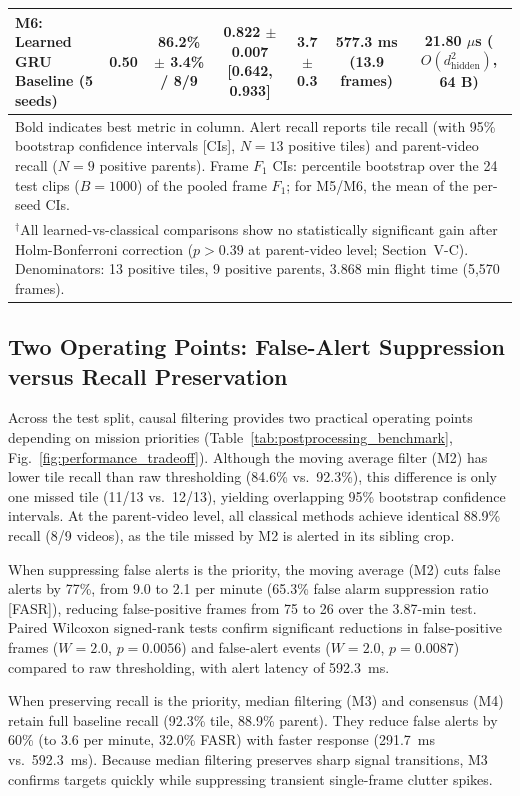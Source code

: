 \documentclass[conference]{IEEEtran}
\begin{document}
\begin{table}[t]
{\begin{tabular}{lcccccc}
M6: Learned GRU Baseline (5 seeds)     & 0.50 & 86.2\% $\pm$ 3.4\% / 8/9                     & \textbf{0.822 $\pm$ 0.007 [0.642, 0.933]} & 3.7 $\pm$ 0.3  & 577.3 ms (13.9 frames)          & 21.80 $\mu$s ($O(d_{\text{hidden}}^2)$, 64 B) \\
\bottomrule
\multicolumn{7}{l}{\footnotesize Bold indicates best metric in column. Alert recall reports tile recall (with 95\% bootstrap confidence intervals [CIs], $N=13$ positive tiles) and parent-video recall ($N=9$ positive parents). Frame $F_1$ CIs: percentile bootstrap over the 24 test clips ($B=1000$) of the pooled frame $F_1$; for M5/M6, the mean of the per-seed CIs.} \\
\multicolumn{7}{l}{\footnotesize $^\dagger$All learned-vs-classical comparisons show no statistically significant gain after Holm-Bonferroni correction ($p > 0.39$ at parent-video level; Section~V-C). Denominators: 13 positive tiles, 9 positive parents, 3.868 min flight time (5,570 frames).}
\end{tabular}%
}
\end{table}

\subsection{Two Operating Points: False-Alert Suppression versus Recall Preservation}
Across the test split, causal filtering provides two practical operating points depending on mission priorities (Table~\ref{tab:postprocessing_benchmark}, Fig.~\ref{fig:performance_tradeoff}). Although the moving average filter (M2) has lower tile recall than raw thresholding (84.6\% vs.\ 92.3\%), this difference is only one missed tile (11/13 vs.\ 12/13), yielding overlapping 95\% bootstrap confidence intervals. At the parent-video level, all classical methods achieve identical 88.9\% recall (8/9 videos), as the tile missed by M2 is alerted in its sibling crop.

When suppressing false alerts is the priority, the moving average (M2) cuts false alerts by 77\%, from 9.0 to 2.1 per minute (65.3\% false alarm suppression ratio [FASR]), reducing false-positive frames from 75 to 26 over the 3.87-min test. Paired Wilcoxon signed-rank tests confirm significant reductions in false-positive frames ($W=2.0$, $p=0.0056$) and false-alert events ($W=2.0$, $p=0.0087$) compared to raw thresholding, with alert latency of 592.3~ms.

When preserving recall is the priority, median filtering (M3) and consensus (M4) retain full baseline recall (92.3\% tile, 88.9\% parent). They reduce false alerts by 60\% (to 3.6 per minute, 32.0\% FASR) with faster response (291.7~ms vs.\ 592.3~ms). Because median filtering preserves sharp signal transitions, M3 confirms targets quickly while suppressing transient single-frame clutter spikes.
\end{document}

